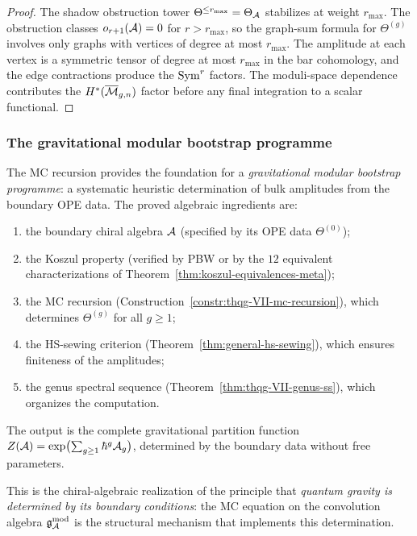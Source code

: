 \begin{proof}
The shadow obstruction tower $\Theta^{\leq r_{\max}} = \Theta_{\mathcal{A}}$
stabilizes at weight $r_{\max}$. The obstruction classes
$o_{r+1}(\mathcal{A}) = 0$ for $r > r_{\max}$, so the graph-sum
formula for $\Theta^{(g)}$ involves only graphs with vertices
of degree at most $r_{\max}$. The amplitude at each vertex is
a symmetric tensor of degree at most $r_{\max}$ in the bar
cohomology, and the edge contractions produce the $\operatorname{Sym}^r$
factors. The moduli-space dependence contributes the
$H^*(\overline{\mathcal{M}}_{g,n})$ factor before any final integration to a
scalar functional.
\end{proof}

\subsubsection{The gravitational modular bootstrap programme}
\label{subsubsec:thqg-VII-grav-bootstrap}

\begin{remark}
\label{rem:thqg-VII-grav-bootstrap}
The MC recursion provides the foundation for a
\emph{gravitational modular bootstrap programme}: a systematic
heuristic determination of bulk amplitudes from the boundary OPE data.
The proved algebraic ingredients are:
\begin{enumerate}[label=(\arabic*)]
\item the boundary chiral algebra $\mathcal{A}$ (specified by its
 OPE data $\Theta^{(0)}$);
\item the Koszul property (verified by PBW or by the $12$
 equivalent characterizations of
 Theorem~\ref{thm:koszul-equivalences-meta});
\item the MC recursion
 (Construction~\ref{constr:thqg-VII-mc-recursion}), which
 determines $\Theta^{(g)}$ for all $g \geq 1$;
\item the HS-sewing criterion
 (Theorem~\ref{thm:general-hs-sewing}), which ensures
 finiteness of the amplitudes;
\item the genus spectral sequence
 (Theorem~\ref{thm:thqg-VII-genus-ss}), which organizes
 the computation.
\end{enumerate}
The output is the complete gravitational partition function
$Z(\mathcal{A}) = \exp\bigl(\sum_{g \geq 1} \hbar^g \mathcal{A}_g\bigr)$,
determined by the boundary data without free parameters.

This is the chiral-algebraic realization of the principle
that \emph{quantum gravity is determined by its boundary
conditions}: the MC equation on the convolution algebra
$\mathfrak{g}_{\mathcal{A}}^{\mathrm{mod}}$ is the structural mechanism that implements this
determination.
\end{remark}


